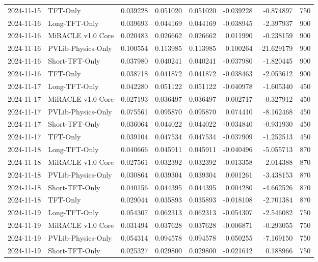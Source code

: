 \begin{tabular}{llrrrrrr}
2024-11-15 & TFT-Only & 0.039228 & 0.051020 & 0.051020 & -0.039228 & -0.874897 & 750 \\
2024-11-16 & Long-TFT-Only & 0.039693 & 0.044169 & 0.044169 & -0.038945 & -2.397937 & 900 \\
2024-11-16 & MiRACLE v1.0 Core & 0.020483 & 0.026662 & 0.026662 & 0.011990 & -0.238159 & 900 \\
2024-11-16 & PVLib-Physics-Only & 0.100554 & 0.113985 & 0.113985 & 0.100264 & -21.629179 & 900 \\
2024-11-16 & Short-TFT-Only & 0.037980 & 0.040241 & 0.040241 & -0.037980 & -1.820445 & 900 \\
2024-11-16 & TFT-Only & 0.038718 & 0.041872 & 0.041872 & -0.038463 & -2.053612 & 900 \\
2024-11-17 & Long-TFT-Only & 0.042280 & 0.051122 & 0.051122 & -0.040978 & -1.605340 & 450 \\
2024-11-17 & MiRACLE v1.0 Core & 0.027193 & 0.036497 & 0.036497 & 0.002717 & -0.327912 & 450 \\
2024-11-17 & PVLib-Physics-Only & 0.075561 & 0.095870 & 0.095870 & 0.074410 & -8.162468 & 450 \\
2024-11-17 & Short-TFT-Only & 0.036064 & 0.044022 & 0.044022 & -0.034840 & -0.931930 & 450 \\
2024-11-17 & TFT-Only & 0.039104 & 0.047534 & 0.047534 & -0.037909 & -1.252513 & 450 \\
2024-11-18 & Long-TFT-Only & 0.040666 & 0.045911 & 0.045911 & -0.040496 & -5.055713 & 870 \\
2024-11-18 & MiRACLE v1.0 Core & 0.027561 & 0.032392 & 0.032392 & -0.013358 & -2.014388 & 870 \\
2024-11-18 & PVLib-Physics-Only & 0.030864 & 0.039304 & 0.039304 & 0.001261 & -3.438153 & 870 \\
2024-11-18 & Short-TFT-Only & 0.040156 & 0.044395 & 0.044395 & 0.004280 & -4.662526 & 870 \\
2024-11-18 & TFT-Only & 0.029044 & 0.035893 & 0.035893 & -0.018108 & -2.701384 & 870 \\
2024-11-19 & Long-TFT-Only & 0.054307 & 0.062313 & 0.062313 & -0.054307 & -2.546082 & 750 \\
2024-11-19 & MiRACLE v1.0 Core & 0.031494 & 0.037628 & 0.037628 & -0.006871 & -0.293055 & 750 \\
2024-11-19 & PVLib-Physics-Only & 0.054314 & 0.094578 & 0.094578 & 0.050255 & -7.169150 & 750 \\
2024-11-19 & Short-TFT-Only & 0.025327 & 0.029800 & 0.029800 & -0.021612 & 0.188966 & 750 \\

\end{tabular}
